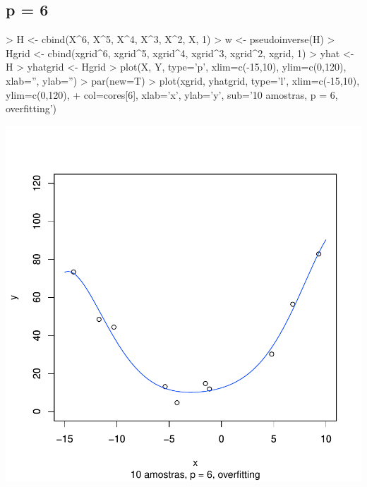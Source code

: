 \documentclass{article}
\begin{document}
\subsection{p = 6}
\begin{Schunk}
\begin{Sinput}
> H <- cbind(X^6, X^5, X^4, X^3, X^2, X, 1)
> w <- pseudoinverse(H) %
> Hgrid <- cbind(xgrid^6, xgrid^5, xgrid^4, xgrid^3, xgrid^2, xgrid, 1)
> yhat <- H %
> yhatgrid <- Hgrid %
> plot(X, Y, type='p', xlim=c(-15,10), ylim=c(0,120), xlab='', ylab='')
> par(new=T)
> plot(xgrid, yhatgrid, type='l', xlim=c(-15,10), ylim=c(0,120),
+      col=cores[6], xlab='x', ylab='y', sub='10 amostras, p = 6, overfitting')
\end{Sinput}
\end{Schunk}
\includegraphics{aprox-007}
\end{document}
